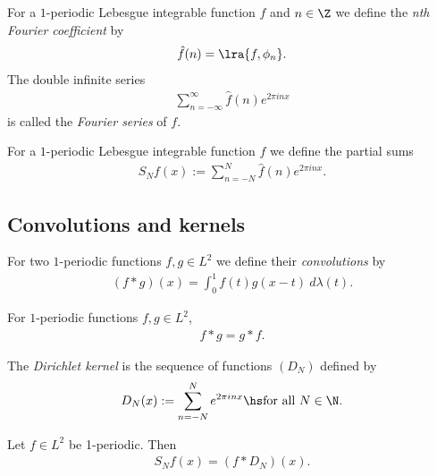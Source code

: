 \documentclass{article}
\begin{document}
\begin{definition}
	For a $1$-periodic Lebesgue integrable function $f$ and $n\in\Z$ we define the \emph{nth Fourier coefficient}
	by
	\begin{align*}
		\hat f(n) = \lra{f, \phi_n}.
	\end{align*}
	The double infinite series
	\begin{align*}
		\sum_{n=-\infty}^\infty \hat f(n) e^{2\pi inx}
	\end{align*}
	is called the \emph{Fourier series} of $f$.
\end{definition}

\begin{definition}
	For a $1$-periodic Lebesgue integrable function $f$ we define the partial sums
	\begin{align*}
		S_Nf(x):=\sum_{n=-N}^N \hat f(n) e^{2\pi inx}.
	\end{align*}
\end{definition}

\subsection{Convolutions and kernels}

\begin{definition}
	For two $1$-periodic functions $f,g\in L^2$ we define their \emph{convolutions}
	by
	\begin{align*}
		(f*g)(x)=\int_0^1 f(t)g(x-t)\:d\lambda(t).
	\end{align*}
\end{definition}

\begin{lemma}[Notes 5.2]
	For $1$-periodic functions $f,g\in L^2$,
	\begin{align*}
		f*g=g*f.
	\end{align*}
\end{lemma}

\begin{definition}
	The \emph{Dirichlet kernel} is the sequence of functions
	$(D_N)$ defined by
	\begin{align*}
		D_N(x):=\sum_{n=-N}^N e^{2\pi inx} \hs \text{for all }N\in\N.
	\end{align*}
\end{definition}

\begin{lemma}
	Let $f\in L^2$ be 1-periodic. Then
	\begin{align*}
		S_Nf(x) = (f*D_N)(x).
	\end{align*}
\end{lemma}
\end{document}
